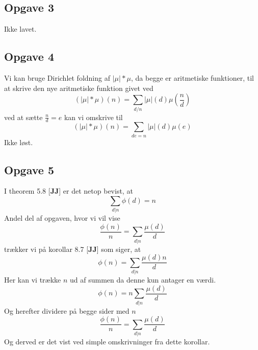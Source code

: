 \documentclass[12pt]{article}
\begin{document}
\subsection*{Opgave 3}
Ikke lavet.

\subsection*{Opgave 4}
Vi kan bruge Dirichlet foldning af $|\mu|*\mu$, da begge er aritmetiske funktioner, til at skrive den nye aritmetiske funktion givet ved
$$(|\mu|*\mu)(n)=\sum_{d/n}|\mu|(d)\mu(\frac{n}{d})$$
ved at sætte $\frac{n}{d}=e$ kan vi omskrive til
$$(|\mu|*\mu)(n)=\sum_{de=n}|\mu|(d)\mu(e)$$
Ikke løst.


\subsection*{Opgave 5}
I theorem 5.8 [\textbf{JJ}] er det netop bevist, at 
$$\sum_{d|n}\phi(d)=n$$
Andel del af opgaven, hvor vi vil vise
$$\frac{\phi(n)}{n}=\sum_{d|n}\frac{\mu(d)}{d}$$
trækker vi på korollar 8.7 [\textbf{JJ}] som siger, at
$$\phi(n)=\sum_{d|n}\frac{\mu(d)n}{d}$$
Her kan vi trække $n$ ud af summen da denne kun antager en værdi.
$$\phi(n)=n\sum_{d|n}\frac{\mu(d)}{d}$$
Og herefter dividere på begge sider med $n$
$$\frac{\phi(n)}{n}=\sum_{d|n}\frac{\mu(d)}{d}$$
Og derved er det vist ved simple omskrivninger fra dette korollar.
\end{document}
